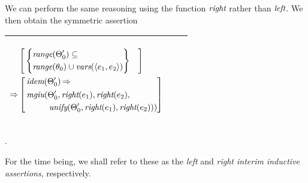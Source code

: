 \documentclass[runningheads]{llncs}
\DeclareMathOperator{\uimplies}{\Rightarrow}
\DeclareMathOperator{\unify}{\emph{unify}}
\DeclareMathOperator{\lef}{\emph{left}}
\DeclareMathOperator{\rig}{\emph{right}}
\DeclareMathOperator{\idem}{\emph{idem}}
\DeclareMathOperator{\mgiu}{\emph{mgiu}}
\begin{document}
We can perform the same reasoning using the function $\rig$ rather than $\lef$. We then obtain the symmetric assertion
  \begin{center}
  \begin{tabular}{|m{}|m{}||m{}|}
\hline
\begin{center}
{$\begin{aligned}
 &\begin{aligned}
&\begin{aligned}
&\left[\begin{aligned}
 &\left\{\begin{aligned}
 &\range(\Thet{0}') \subseteq \\
  &\range(\thet{0})\cup\vars(\langle \e{1}, \e{2} \rangle) 
  \end{aligned}\right\} 
  \end{aligned}\right] 
  \end{aligned} 
\end{aligned} \\
 \uimplies &\left[\begin{aligned}&\idem(\Thet{0}') \uimplies \\
 &\begin{aligned}
    {\,\mgiu}(&\Thet{0}', \rig(\e{1}), \rig(\e{2}), \\
    &\unify(\Thet{0}', \rig(\e{1}), \rig(\e{2}))) 
\end{aligned}
\end{aligned}\right] \end{aligned}  $}  \hspace{1cm} 
\end{center}& &  \\  \hline
\end{tabular}.
\end{center}
For the time being, we shall refer to these as the \emph{left} and \emph{right interim inductive assertions}, respectively. 
\end{document}
